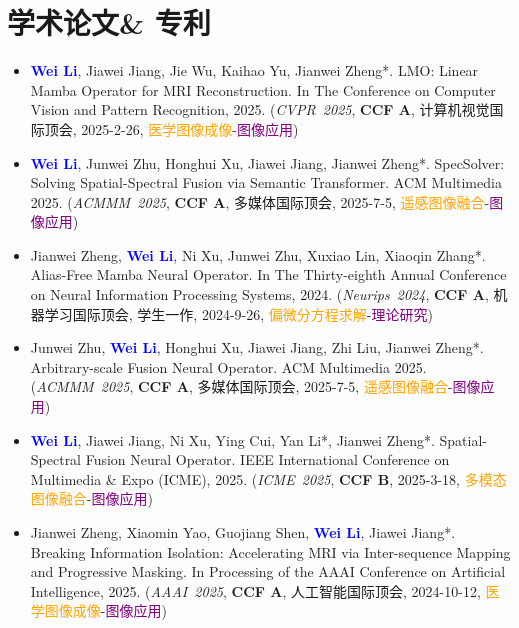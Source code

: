 \documentclass{resume}
\begin{document}
\section{\faTrophy 学术论文\& 专利}
\begin{itemize}[parsep=0.2ex]
  \item \textbf{\textcolor{blue}{Wei Li}}, Jiawei Jiang, Jie Wu, Kaihao Yu, Jianwei Zheng*. LMO: Linear Mamba Operator for MRI Reconstruction. In The Conference on Computer Vision and Pattern Recognition, 2025. (\textit{CVPR\ 2025}, \textbf{CCF A}, 计算机视觉国际顶会, 2025-2-26, \textcolor{orange}{医学图像成像}-\textcolor{Purple}{图像应用}) 
  
  \item \textbf{\textcolor{blue}{Wei Li}}, Junwei Zhu, Honghui Xu, Jiawei Jiang, Jianwei Zheng*. SpecSolver: Solving Spatial-Spectral Fusion via Semantic Transformer. ACM Multimedia 2025. (\textit{ACMMM\ 2025}, \textbf{CCF A}, 多媒体国际顶会, 2025-7-5, \textcolor{orange}{遥感图像融合}-\textcolor{Purple}{图像应用})
  
  \item Jianwei Zheng, \textbf{\textcolor{blue}{Wei Li}}, Ni Xu, Junwei Zhu, Xuxiao Lin, Xiaoqin Zhang*. Alias-Free Mamba Neural Operator. In The Thirty-eighth Annual Conference on Neural Information Processing Systems, 2024. (\textit{Neurips\ 2024}, \textbf{CCF A}, 机器学习国际顶会, 学生一作, 2024-9-26, \textcolor{orange}{偏微分方程求解}-\textcolor{Purple}{理论研究})
  
  \item Junwei Zhu, \textbf{\textcolor{blue}{Wei Li}}, Honghui Xu, Jiawei Jiang, Zhi Liu, Jianwei Zheng*. Arbitrary-scale Fusion Neural Operator. ACM Multimedia 2025. (\textit{ACMMM\ 2025}, \textbf{CCF A}, 多媒体国际顶会, 2025-7-5, \textcolor{orange}{遥感图像融合}-\textcolor{Purple}{图像应用})
  
  \item \textbf{\textcolor{blue}{Wei Li}}, Jiawei Jiang, Ni Xu, Ying Cui, Yan Li*, Jianwei Zheng*. Spatial-Spectral Fusion Neural Operator. IEEE International Conference on Multimedia \& Expo (ICME), 2025. (\textit{ICME\ 2025}, \textbf{CCF B}, 2025-3-18, \textcolor{orange}{多模态图像融合}-\textcolor{Purple}{图像应用})
  
  \item Jianwei Zheng, Xiaomin Yao, Guojiang Shen, \textbf{\textcolor{blue}{Wei Li}}, Jiawei Jiang*. Breaking Information Isolation: Accelerating MRI via Inter-sequence Mapping and Progressive Masking. In Processing of the AAAI Conference on Artificial Intelligence, 2025. (\textit{AAAI\ 2025}, \textbf{CCF A}, 人工智能国际顶会, 2024-10-12, \textcolor{orange}{医学图像成像}-\textcolor{Purple}{图像应用})


\end{itemize}
\end{document}
